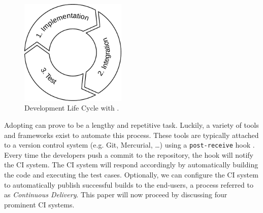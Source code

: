 \begin{figure}[htbp!]
	\centering
	\includegraphics[width=0.45\textwidth]{assets/images/ci-lifecycle.pdf}
	\caption{Development Life Cycle with \CI{}.}
	\label{fig:agile-ci-lifecycle}
\end{figure}

\noindent Adopting \CI{} can prove to be a lengthy and repetitive task. Luckily, a variety of tools and frameworks exist to automate this process. These tools are typically attached to a version control system (e.g. Git, Mercurial, \dots) using a \texttt{post-receive} hook \cite{SmartJenkinsDefinitive}. Every time the developers push a commit to the repository, the hook will notify the CI system. The CI system will respond accordingly by automatically building the code and executing the test cases. Optionally, we can configure the CI system to automatically publish successful builds to the end-users, a process referred to as \emph{Continuous Delivery}. This paper will now proceed by discussing four prominent CI systems.




